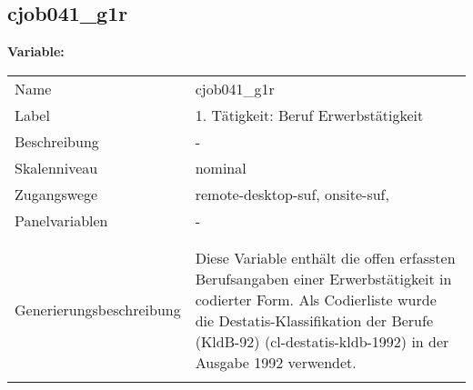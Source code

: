 	
	
	\subsection{cjob041\_g1r}
	\label{subSection:cjob041_g1r}

	\noindent\textbf{Variable:}\\
		\begin{tabular}{lL{11.3cm}}
			\label{tableVariable:cjob041_g1r}
			Name & cjob041\_g1r \\
			Label & 1. Tätigkeit: Beruf Erwerbstätigkeit \\
			Beschreibung & - \\
			Skalenniveau & nominal \\
			Zugangswege &
				remote-desktop-suf,
				onsite-suf,
 \\
			Panelvariablen & -
			 \\
			 \\
 \\
					Generierungsbeschreibung & Diese Variable enthält die offen erfassten Berufsangaben einer Erwerbstätigkeit in codierter Form. Als Codierliste wurde die Destatis-Klassifikation der Berufe (KldB-92) (cl-destatis-kldb-1992) in der Ausgabe 1992 verwendet. 
				 \\	
			 \\
		\end{tabular}






